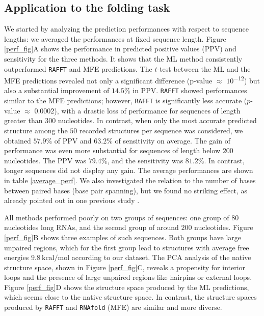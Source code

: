 \subsection*{Application to the folding task}
We started by analyzing the prediction performances with respect to sequence lengths: we averaged the performances at fixed sequence length. Figure \ref{perf_fig}A shows the performance in predicted positive values (PPV) and sensitivity for the three methods. It shows that the ML method consistently outperformed \texttt{RAFFT} and MFE predictions. The $t$-test between the ML and the MFE predictions revealed not only a significant difference (p-value \(\approx\) $10$\textsuperscript{$-12$}) but also a substantial improvement of $14.5\%$ in PPV. \texttt{RAFFT} showed performances similar to the MFE predictions; however, \texttt{RAFFT} is significantly less accurate ($p$-value \(\approx\) $0.0002$), with a drastic loss of performance for sequences of length greater than $300$ nucleotides. In contrast, when only the most accurate predicted structure among the $50$ recorded structures per sequence was considered, we obtained $57.9\%$ of PPV and $63.2\%$ of sensitivity on average. The gain of performance was even more substantial for sequences of length below $200$ nucleotides. The PPV was $79.4\%$, and the sensitivity was $81.2\%$. In contrast, longer sequences did not display any gain. The average performances are shown in table \ref{average_perf}. We also investigated the relation to the number of bases between paired bases (base pair spanning), but we found no striking effect, as already pointed out in one previous study \cite{amman13_troub_long_range_base_pairs_rna_foldin}.

All methods performed poorly on two groups of sequences: one group of $80$ nucleotides long RNAs, and the second group of around $200$ nucleotides. Figure \ref{perf_fig}B shows three examples of such sequences. Both groups have large unpaired regions, which for the first group lead to structures with average free energies $9.8\ \textrm{kcal/mol}$ according to our dataset. The PCA analysis of the native structure space, shown in Figure \ref{perf_fig}C, reveals a propensity for interior loops and the presence of large unpaired regions like hairpins or external loops. Figure \ref{perf_fig}D shows the structure space produced by the ML predictions, which seems close to the native structure space. In contrast, the structure spaces produced by \texttt{RAFFT} and \texttt{RNAfold} (MFE) are similar and more diverse.

